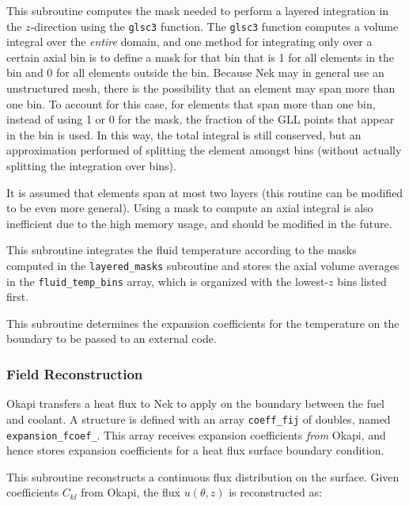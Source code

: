 \documentclass[10pt]{article}
\newcounter{subsubsubsection}[subsubsection]
\numberwithin{equation}{section} %
\begin{document}
This subroutine computes the mask needed to perform a layered integration in the \(z\)-direction using the {\tt glsc3} function. The {\tt glsc3} function computes a volume integral over the {\it entire} domain, and one method for integrating only over a certain axial bin is to define a mask for that bin that is 1 for all elements in the bin and 0 for all elements outside the bin. Because Nek may in general use an unstructured mesh, there is the possibility that an element may span more than one bin. To account for this case, for elements that span more than one bin, instead of using 1 or 0 for the mask, the fraction of the GLL points that appear in the bin is used. In this way, the total integral is still conserved, but an approximation performed of splitting the element amongst bins (without actually splitting the integration over bins). 

\color{magenta}
It is assumed that elements span at most two layers (this routine can be modified to be even more general). Using a mask to compute an axial integral is also inefficient due to the high memory usage, and should be modified in the future. 
\color{black}

This subroutine integrates the fluid temperature according to the masks computed in the {\tt layered\_masks} subroutine and stores the axial volume averages in the {\tt fluid\_temp\_bins} array, which is organized with the lowest-\(z\) bins listed first.

This subroutine determines the expansion coefficients for the temperature on the boundary to be passed to an external code.

\subsubsection{Field Reconstruction}
Okapi transfers a heat flux to Nek to apply on the boundary between the fuel and coolant. A structure is defined with an array {\tt coeff\_fij} of doubles, named {\tt expansion\_fcoef\_}. This array receives expansion coefficients {\it from} Okapi, and hence stores expansion coefficients for a heat flux surface boundary condition. 

This subroutine reconstructs a continuous flux distribution on the surface. Given coefficients \(C_{kl}\) from Okapi, the flux \(u(\theta, z)\) is reconstructed as:
\end{document}
